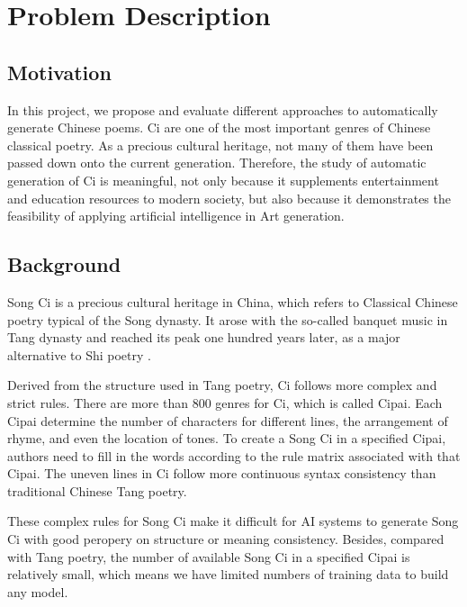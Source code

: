 \section{Problem Description}
\subsection{Motivation}  
%
In this project, we propose and evaluate different approaches to automatically generate Chinese poems. 
%
Ci are one of the most important genres of Chinese classical poetry. 
%
As a precious cultural heritage, not many of them have been passed down onto the current generation.
%
Therefore, the study of automatic generation of Ci is meaningful, not only because it supplements entertainment and education resources to modern society, but also because it demonstrates the feasibility of applying artificial intelligence in Art generation. 
%

\subsection{Background}
Song Ci is a precious cultural heritage in China, which refers to Classical Chinese poetry typical of the Song dynasty.
%
It arose with the so-called banquet music in Tang dynasty and reached its peak one hundred years later, as a major alternative to Shi poetry\cite{cai2008chinesepoetry} .


Derived from the structure used in Tang poetry, Ci follows more complex and strict rules.
%
There are more than 800 genres for Ci, which is called Cipai\cite{wikici}. 
%
Each Cipai determine the number of characters for different lines, the arrangement of rhyme, and even the location of tones.
%
To create a Song Ci in a specified Cipai, authors need to fill in the words according to the rule matrix associated with that Cipai.
 The uneven lines in Ci follow more continuous syntax consistency than traditional Chinese Tang poetry\cite{cai2008chinesepoetry}.
 
These complex rules for Song Ci make it difficult for AI systems to generate Song Ci with good peropery on structure or meaning consistency.
%
Besides, compared with Tang poetry, the number of available Song Ci in a specified Cipai is relatively small\cite{}, which means we have limited numbers of training data to build any model. 


